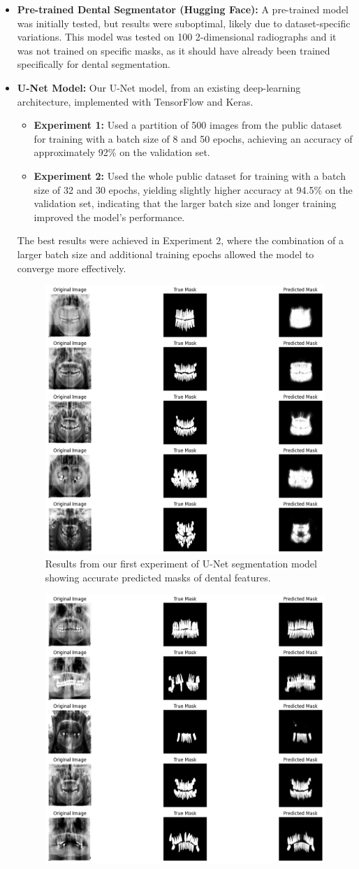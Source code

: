 \documentclass[12pt]{article}
\begin{document}
\begin{itemize}
    \item \textbf{Pre-trained Dental Segmentator (Hugging Face):} A pre-trained model was initially tested, but results were suboptimal, likely due to dataset-specific variations. This model was tested on 100 2-dimensional radiographs and it was not trained on specific masks, as it should have already been trained specifically for dental segmentation.
    \item \textbf{U-Net Model:} Our U-Net model, from an existing deep-learning architecture, implemented with TensorFlow and Keras.
    \begin{itemize}
        \item \textbf{Experiment 1:} Used a partition of 500 images from the public dataset for training with a batch size of 8 and 50 epochs, achieving an accuracy of approximately 92\% on the validation set. 
        \item \textbf{Experiment 2:} Used the whole public dataset for training with a batch size of 32 and 30 epochs, yielding slightly higher accuracy at 94.5\% on the validation set, indicating that the larger batch size and longer training improved the model's performance.
    \end{itemize}
    The best results were achieved in Experiment 2, where the combination of a larger batch size and additional training epochs allowed the model to converge more effectively.
\begin{figure}
    \centering
    \includegraphics[width=0.5\linewidth]{output.png}
    \caption{Results from our first experiment of U-Net segmentation model showing accurate predicted masks of dental features.}
    \label{fig:enter-label}
\end{figure}
\begin{figure}[H]
    \centering
    \includegraphics[width=0.5\linewidth]{theeth_v2.png}

\end{figure}
\end{itemize}
\end{document}
